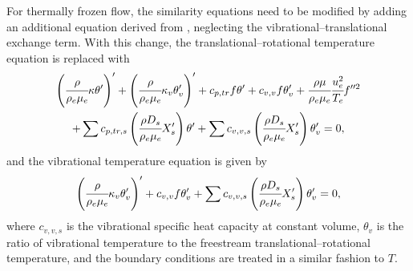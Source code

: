For thermally frozen flow, the similarity equations need to be modified by adding an additional equation derived from , neglecting the vibrational--translational exchange term. With this change, the translational--rotational temperature equation  is replaced with
\begin{multline}\label{equation:similarity:tne_energy}
    \left(\cfrac{\rho}{\rho_e \mu_e} \kappa \theta'\right)' + \left(\cfrac{\rho}{\rho_e \mu_e} \kappa_v \theta'_v\right)' + c_{p,tr} f \theta' + c_{v,v} f \theta'_{v} + \cfrac{\rho \mu}{\rho_e \mu_e} \cfrac{u_{e}^{2}}{T_e} f''^{2} \\
    + \sum c_{p,tr,s} \left(\cfrac{\rho D_s}{\rho_e \mu_e} X'_s\right) \theta' + \sum c_{v,v,s} \left(\cfrac{\rho D_s}{\rho_e \mu_e} X'_s\right) \theta_v' = 0,
\end{multline}
and the vibrational temperature equation is given by
\begin{equation}\label{equation:similarity:vibration}
    \left(\cfrac{\rho}{\rho_e \mu_e} \kappa_v \theta'_v\right)' + c_{v,v} f \theta'_{v} + \sum c_{v,v,s} \left(\cfrac{\rho D_s}{\rho_e \mu_e} X'_s\right) \theta'_{v} = 0,
\end{equation}
where $c_{v,v,s}$ is the vibrational specific heat capacity at constant volume, $\theta_v$ is the ratio of vibrational temperature to the freestream translational--rotational temperature, and the boundary conditions are treated in a similar fashion to $T$.



